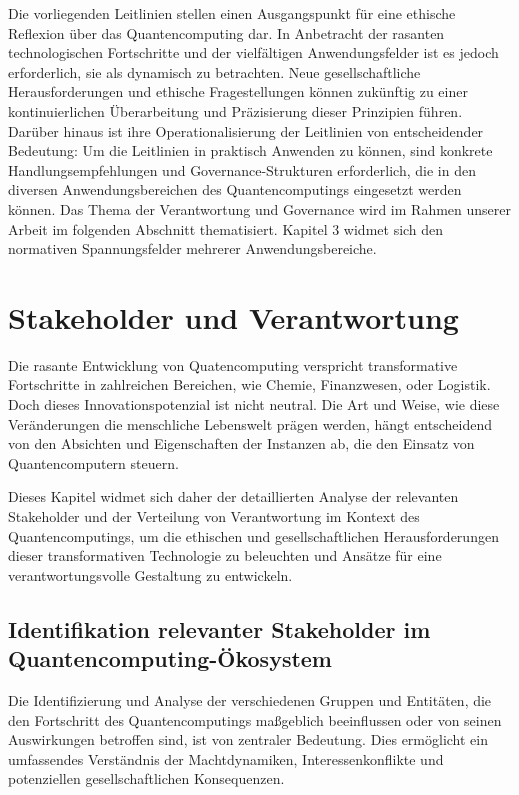 Die vorliegenden Leitlinien stellen einen Ausgangspunkt für eine ethische Reflexion über das Quantencomputing dar. In Anbetracht der rasanten technologischen Fortschritte und der vielfältigen Anwendungsfelder ist es jedoch erforderlich, sie als dynamisch zu betrachten. Neue gesellschaftliche Herausforderungen und ethische Fragestellungen können zukünftig zu einer kontinuierlichen Überarbeitung und Präzisierung dieser Prinzipien führen. Darüber hinaus ist ihre Operationalisierung der Leitlinien von entscheidender Bedeutung: Um die Leitlinien in praktisch Anwenden zu können, sind konkrete Handlungsempfehlungen und Governance-Strukturen erforderlich, die in den diversen  Anwendungsbereichen des Quantencomputings eingesetzt werden können. Das Thema der Verantwortung und Governance wird im Rahmen unserer Arbeit im folgenden Abschnitt thematisiert. Kapitel 3 widmet sich den normativen Spannungsfelder mehrerer Anwendungsbereiche.


\section{Stakeholder und Verantwortung}
Die rasante Entwicklung von Quatencomputing verspricht transformative Fortschritte in zahlreichen Bereichen, wie Chemie, Finanzwesen, oder Logistik. Doch dieses Innovationspotenzial ist nicht neutral. Die Art und Weise, wie diese Veränderungen die menschliche Lebenswelt prägen werden, hängt entscheidend von den Absichten und Eigenschaften der Instanzen ab, die den Einsatz von Quantencomputern steuern.\cite{troyer_quantum_2024} 

Dieses Kapitel widmet sich daher der detaillierten Analyse der relevanten Stakeholder und der Verteilung von Verantwortung im Kontext des Quantencomputings, um die ethischen und gesellschaftlichen Herausforderungen dieser transformativen Technologie zu beleuchten und Ansätze für eine verantwortungsvolle Gestaltung zu entwickeln. 


\subsection{Identifikation relevanter Stakeholder im Quantencomputing-Ökosystem}
Die Identifizierung und Analyse der verschiedenen Gruppen und Entitäten, die den Fortschritt des Quantencomputings maßgeblich beeinflussen oder von seinen Auswirkungen betroffen sind, ist von zentraler Bedeutung. Dies ermöglicht ein umfassendes Verständnis der Machtdynamiken, Interessenkonflikte und potenziellen gesellschaftlichen Konsequenzen. \cite{troyer_quantum_2024}

